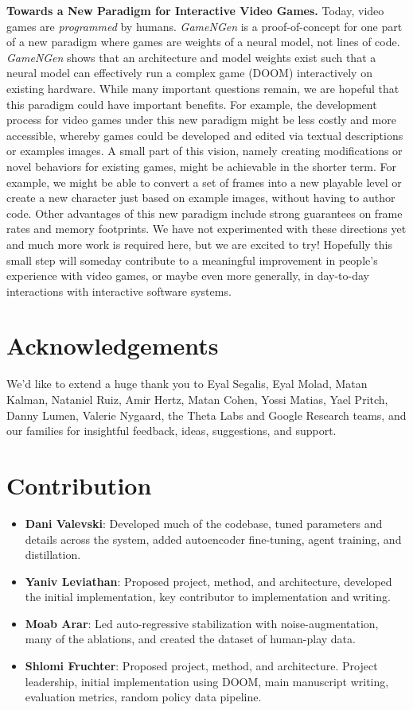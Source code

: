 \documentclass{article} %
\begin{document}
\textbf{Towards a New Paradigm for Interactive Video Games.}
Today, video games are \emph{programmed} by humans.
\emph{GameNGen} is a proof-of-concept for one part of a new paradigm where games are weights of a neural model, not lines of code.
\emph{GameNGen} shows that an architecture and model weights exist such that a neural model can effectively run a complex game (DOOM) interactively on existing hardware.
While many important questions remain, we are hopeful that this paradigm could have important benefits.
For example, the development process for video games under this new paradigm might be less costly and more accessible, whereby games could be developed and edited via textual descriptions or examples images.
A small part of this vision, namely creating modifications or novel behaviors for existing games, might be achievable in the shorter term. 
For example, we might be able to convert a set of frames into a new playable level or create a new character just based on example images, without having to author code.
Other advantages of this new paradigm include strong guarantees on frame rates and memory footprints.
We have not experimented with these directions yet and much more work is required here, but we are excited to try!
Hopefully this small step will someday contribute to a meaningful improvement in people’s experience with video games, or maybe even more generally, in day-to-day interactions with interactive software systems.

\section*{Acknowledgements}

We'd like to extend a huge thank you to Eyal Segalis, Eyal Molad, Matan Kalman, Nataniel Ruiz, Amir Hertz, Matan Cohen, Yossi Matias, Yael Pritch, Danny Lumen, Valerie Nygaard, the Theta Labs and Google Research teams, and our families for insightful feedback, ideas, suggestions, and support.

\section*{Contribution}

\begin{itemize}
    \item \textbf{Dani Valevski}: Developed much of the codebase, tuned parameters and details across the system, added autoencoder fine-tuning, agent training, and distillation.
    \item \textbf{Yaniv Leviathan}: Proposed project, method, and architecture, developed the initial implementation, key contributor to implementation and writing.
    \item \textbf{Moab Arar}: Led auto-regressive stabilization with noise-augmentation, many of the ablations, and created the dataset of human-play data.
    \item \textbf{Shlomi Fruchter}: Proposed project, method, and architecture. Project leadership, initial implementation using DOOM, main manuscript writing, evaluation metrics, random policy data pipeline.
\end{itemize}
\end{document}
